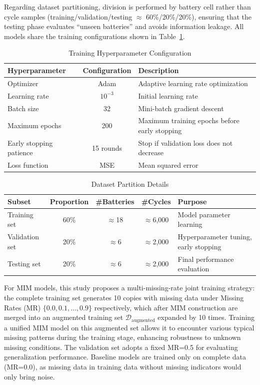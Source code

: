 \documentclass[10pt,a4paper]{article}
\begin{document}
Regarding dataset partitioning, division is performed by battery cell rather than cycle samples (training/validation/testing $\approx$ 60\%/20\%/20\%), ensuring that the testing phase evaluates ``unseen batteries'' and avoids information leakage. All models share the training configurations shown in Table~\ref{tab:training_config}.

\begin{table}[H]
\centering
\caption{Training Hyperparameter Configuration}
\label{tab:training_config}
\begin{tabular}{@{}lcl@{}}
\toprule
\textbf{Hyperparameter} & \textbf{Configuration} & \textbf{Description} \\
\midrule
Optimizer & Adam & Adaptive learning rate optimization \\
Learning rate & $10^{-3}$ & Initial learning rate \\
Batch size & 32 & Mini-batch gradient descent \\
Maximum epochs & 200 & Maximum training epochs before early stopping \\
Early stopping patience & 15 rounds & Stop if validation loss does not decrease \\
Loss function & MSE & Mean squared error \\
\bottomrule
\end{tabular}
\end{table}

\begin{table}[H]
\centering
\caption{Dataset Partition Details}
\label{tab:data_split}
\begin{tabular}{@{}lcccp{5cm}@{}}
\toprule
\textbf{Subset} & \textbf{Proportion} & \textbf{\#Batteries} & \textbf{\#Cycles} & \textbf{Purpose} \\
\midrule
Training set & 60\% & $\approx$18 & $\approx$6,000 & Model parameter learning \\
Validation set & 20\% & $\approx$6 & $\approx$2,000 & Hyperparameter tuning, early stopping \\
Testing set & 20\% & $\approx$6 & $\approx$2,000 & Final performance evaluation \\
\bottomrule
\end{tabular}
\end{table}

For MIM models, this study proposes a multi-missing-rate joint training strategy: the complete training set generates 10 copies with missing data under Missing Rates (MR) $\{0.0, 0.1, \ldots, 0.9\}$ respectively, which after MIM construction are merged into an augmented training set $\mathcal{D}_{\text{augmented}}$ expanded by 10 times. Training a unified MIM model on this augmented set allows it to encounter various typical missing patterns during the training stage, enhancing robustness to unknown missing conditions. The validation set adopts a fixed MR=0.5 for evaluating generalization performance. Baseline models are trained only on complete data (MR=0.0), as missing data in training data without missing indicators would only bring noise.
\end{document}
